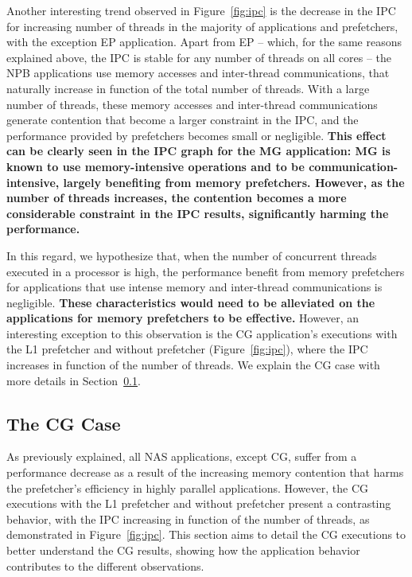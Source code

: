 \documentclass[AMA,final,STIX1COL]{WileyNJD-v2}
\newcommand\new[1]{{\color{red}\textbf{#1}}}
\begin{document}
Another interesting trend observed in Figure~\ref{fig:ipc} is the decrease in the IPC for increasing number of threads in the majority of applications and prefetchers, with the exception EP application.
Apart from EP -- which, for the same reasons explained above, the IPC is stable for any number of threads on all cores -- the NPB applications use memory accesses and inter-thread communications, that naturally increase in function of the total number of threads. 
With a large number of threads, these memory accesses and inter-thread communications generate contention that become a larger constraint in the IPC, and the performance provided by prefetchers becomes small or negligible. 
\new{This effect can be clearly seen in the IPC graph for the MG application: MG is known to use memory-intensive operations and to be communication-intensive, largely benefiting from memory prefetchers. 
However, as the number of threads increases, the contention becomes a more considerable constraint in the IPC results, significantly harming the performance.}


In this regard, we hypothesize that, when the number of concurrent threads executed in a processor is high, the performance benefit from memory prefetchers for applications that use intense memory and inter-thread communications is negligible. 
\new{These characteristics would need to be alleviated on the applications for memory prefetchers to be effective.} 
However, an interesting exception to this observation is the CG application's executions with the L1 prefetcher and without prefetcher (Figure~\ref{fig:ipc}), where the IPC increases in function of the number of threads. 
We explain the CG case with more details in Section~\ref{subs:cg}.


\subsection{The CG Case}\label{subs:cg}


As previously explained, all NAS applications, except CG, suffer from a performance decrease as a result of the increasing memory contention that harms the prefetcher's efficiency in highly parallel applications.
However, the CG executions with the L1 prefetcher and without prefetcher present a contrasting behavior, with the IPC increasing in function of the number of threads, as demonstrated in Figure~\ref{fig:ipc}.
This section aims to detail the CG executions to better understand the CG results, showing how the application behavior contributes to the different observations. 
\end{document}
